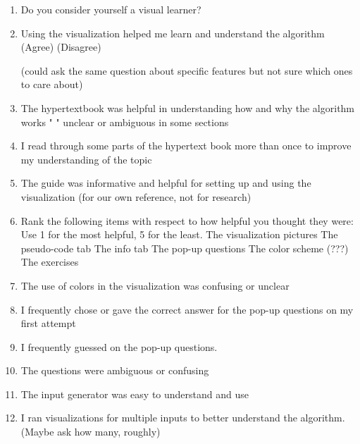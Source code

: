 \documentclass{article}
\begin{document}
\begin{enumerate}

\item Do you consider yourself a visual learner?

\item Using the visualization helped me learn and understand the algorithm (Agree) (Disagree)

(could ask the same question about specific features but not sure which ones to care about)

\item The hypertextbook was helpful in understanding how and why the algorithm works
"                   " unclear or ambiguous in some sections

\item I read through some parts of the hypertext book more than once to improve my understanding of the topic

\item The guide was informative and helpful for setting up and using the visualization (for our own reference, not for research) %

\item Rank the following items with respect to how helpful you thought they were:
Use 1 for the most helpful, 5 for the least.
  The visualization pictures
  The pseudo-code tab
  The info tab
  The pop-up questions
  The color scheme (???)
  The exercises

\item The use of colors in the visualization was confusing or unclear

\item I frequently chose or gave the correct answer for the pop-up questions on my first attempt %

\item I frequently guessed on the pop-up questions.

\item The questions were ambiguous or confusing

\item The input generator was easy to understand and use

\item I ran visualizations for multiple inputs to better understand the algorithm.
(Maybe ask how many, roughly)



\end{enumerate}
\end{document}
